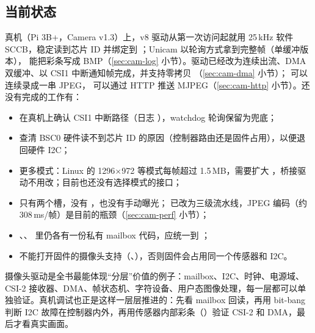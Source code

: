 \subsection{当前状态}

真机（Pi 3B+，Camera v1.3）上，v8 驱动从第一次访问起就用 25\,kHz 软件 SCCB，稳定读到芯片 ID  并绑定到 ；Unicam 以轮询方式拿到完整帧（单缓冲版本）， 能把彩条写成 BMP（\ref{sec:cam-log} 小节）。驱动已经改为连续出流、DMA 双缓冲、以 CSI1 中断通知帧完成，并支持零拷贝 （\ref{sec:cam-dma} 小节）； 可以连续录成一串 JPEG， 可以通过 HTTP 推送 MJPEG（\ref{sec:cam-http} 小节）。还没有完成的工作有：

\begin{itemize}
  \item 在真机上确认 CSI1 中断路径（日志 ），watchdog 轮询保留为兜底；
  \item 查清 BSC0 硬件读不到芯片 ID 的原因（控制器路由还是固件占用），以便退回硬件 I2C；
  \item 更多模式：Linux 的 1296$\times$972 等模式每帧超过 1.5\,MB，需要扩大 ，桥接驱动不用改；目前也还没有选择模式的接口；
  \item 只有两个槽，没有 ，也没有手动曝光； 已改为三级流水线，JPEG 编码（约 308\,ms/帧）是目前的瓶颈（\ref{sec:cam-perf} 小节）；
  \item {}、、 里仍各有一份私有 mailbox 代码，应统一到 ；
  \item {} 不能打开固件的摄像头支持（、），否则固件会占用同一个传感器和 I2C。
\end{itemize}

\begin{remark}
  摄像头驱动是全书最能体现“分层”价值的例子：mailbox、I2C、时钟、电源域、CSI-2 接收器、DMA、帧状态机、字符设备、用户态图像处理，每一层都可以单独验证。真机调试也正是这样一层层推进的：先看 mailbox 回读，再用 bit-bang 判断 I2C 故障在控制器内外，再用传感器内部彩条（）验证 CSI-2 和 DMA，最后才看真实画面。
\end{remark}
